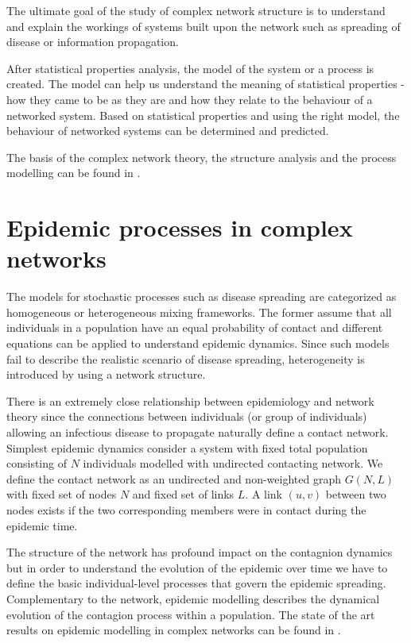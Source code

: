 \documentclass[times, utf8, diplomski]{fer}
\begin{document}
The ultimate goal of the study of complex network structure is to understand and explain the workings of systems built upon the network such as spreading of disease or information propagation.

After statistical properties analysis, the model of the system or a process  is created. The model can help us understand the meaning of statistical properties - how they came to be as they are and how they relate to the behaviour of a networked system. Based on statistical properties and using the right model, the behaviour of networked systems can be determined and predicted.

The basis of the complex network theory, the structure  analysis and the process modelling can be found in \citet{Newman03thestructure}.

\section{Epidemic processes in complex networks}

The models for stochastic processes such as disease spreading are categorized as homogeneous or heterogeneous mixing frameworks. The former assume that all individuals in a population have an equal probability of contact and different equations can be applied to understand epidemic dynamics. Since such models fail to describe the realistic scenario of disease spreading,  heterogeneity is introduced by using a network structure.

There is an extremely close relationship between epidemiology and network theory since the connections between individuals (or group of individuals) allowing an infectious disease to propagate naturally define a contact network. Simplest epidemic dynamics consider a system with fixed total population consisting of $N$ individuals modelled with undirected contacting network. We define the contact network as an undirected and non-weighted graph $G(N, L)$ with fixed set of nodes $N$ and fixed set of links $L$. A link $(u, v)$ between two nodes exists if the two corresponding members were in contact during the epidemic time.

The structure of the network has profound impact on the contagnion dynamics but in order to understand the evolution of the epidemic over time we have to define the basic individual-level processes that govern the epidemic spreading. Complementary to the network, epidemic modelling describes the dynamical evolution of the contagion process within a population. The state of the art results on epidemic modelling in complex networks can be found in \citet{revmod}.
\end{document}
